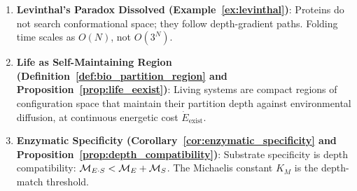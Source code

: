 \begin{chapterbox}[title=Chapter 3 --- Key Results Established]
\begin{enumerate}[label=\textbf{\arabic*.}]
  \item \textbf{Levinthal's Paradox Dissolved (Example~\ref{ex:levinthal})}:
        Proteins do not search conformational space; they follow depth-gradient
        paths. Folding time scales as $O(N)$, not $O(3^N)$.

  \item \textbf{Life as Self-Maintaining Region (Definition~\ref{def:bio_partition_region}
        and Proposition~\ref{prop:life_eexist})}:
        Living systems are compact regions of configuration space that maintain
        their partition depth against environmental diffusion, at continuous
        energetic cost $\dot{E}_{\mathrm{exist}}$.

  \item \textbf{Enzymatic Specificity (Corollary~\ref{cor:enzymatic_specificity}
        and Proposition~\ref{prop:depth_compatibility})}:
        Substrate specificity is depth compatibility:
        $\mathcal{M}_{E \cdot S} < \mathcal{M}_E + \mathcal{M}_S$. The Michaelis constant
        $K_M$ is the depth-match threshold.
\end{enumerate}
\end{chapterbox}
